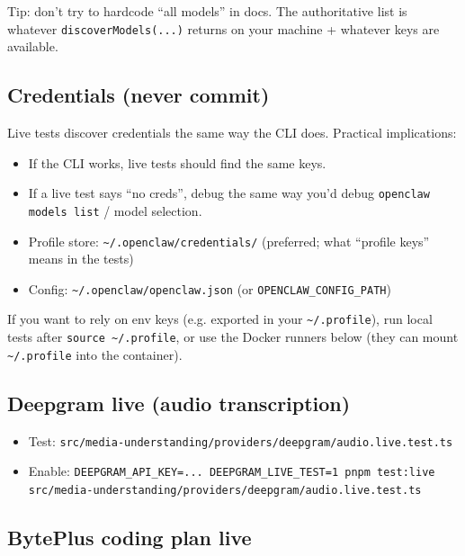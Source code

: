 Tip: don’t try to hardcode “all models” in docs. The authoritative list is whatever \texttt{discoverModels(...)} returns on your machine + whatever keys are available.

\subsection{Credentials (never commit)}


Live tests discover credentials the same way the CLI does. Practical implications:

\begin{itemize}
  \item If the CLI works, live tests should find the same keys.
  \item If a live test says “no creds”, debug the same way you’d debug \texttt{openclaw models list} / model selection.
\end{itemize}


\begin{itemize}
  \item Profile store: \texttt{\textasciitilde{}/.openclaw/credentials/} (preferred; what “profile keys” means in the tests)
  \item Config: \texttt{\textasciitilde{}/.openclaw/openclaw.json} (or \texttt{OPENCLAW\_CONFIG\_PATH})
\end{itemize}


If you want to rely on env keys (e.g. exported in your \texttt{\textasciitilde{}/.profile}), run local tests after \texttt{source \textasciitilde{}/.profile}, or use the Docker runners below (they can mount \texttt{\textasciitilde{}/.profile} into the container).

\subsection{Deepgram live (audio transcription)}


\begin{itemize}
  \item Test: \texttt{src/media-understanding/providers/deepgram/audio.live.test.ts}
  \item Enable: \texttt{DEEPGRAM\_API\_KEY=... DEEPGRAM\_LIVE\_TEST=1 pnpm test:live src/media-understanding/providers/deepgram/audio.live.test.ts}
\end{itemize}


\subsection{BytePlus coding plan live}


